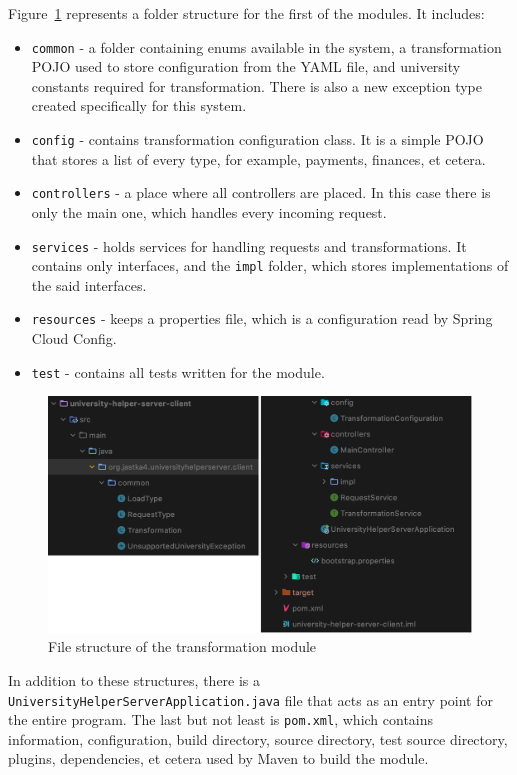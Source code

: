 Figure~\ref{fig:server-client-file-structure} represents a folder structure for the first of the modules. It includes:
\begin{itemize}
    \item \texttt{common} - a folder containing enums available in the system, a transformation POJO used to store configuration from the YAML file, and university constants required for transformation. There is also a new exception type created specifically for this system.
    \item\texttt{config} - contains transformation configuration class. It is a simple POJO that stores a list of every type, for example, payments, finances, et cetera.
    \item \texttt{controllers} - a place where all controllers are placed. In this case there is only the main one, which handles every incoming request.
    \item \texttt{services} - holds services for handling requests and transformations. It contains only interfaces, and the \texttt{impl} folder, which stores implementations of the said interfaces.
    \item \texttt{resources} - keeps a properties file, which is a configuration read by Spring Cloud Config.
    \item \texttt{test} - contains all tests written for the module.
\end{itemize}
\begin{figure}[htb]
    \centering
    \includegraphics[width=.8\linewidth]{fig04/server-client-file-structure.png}
    \caption{File structure of the transformation module}
    \label{fig:server-client-file-structure}
\end{figure}


In addition to these structures, there is a \texttt{UniversityHelperServerApplication.java} file that acts as an entry point for the entire program. The last but not least is \texttt{pom.xml}, which contains information, configuration, build directory, source directory, test source directory, plugins, dependencies, et cetera used by Maven to build the module. \\

